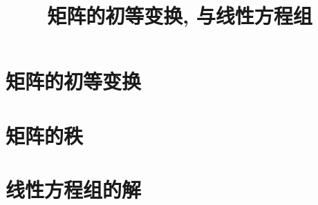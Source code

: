 \documentclass[UTF8]{ctexart}
\title{矩阵的初等变换, 与线性方程组}
\begin{document}
	\tableofcontents %
	\date{} %
	\maketitle  %
	
	
	\part{矩阵的初等变换}
	
	\part{矩阵的秩}
	
	\part{线性方程组的解}
	

	
\end{document}
